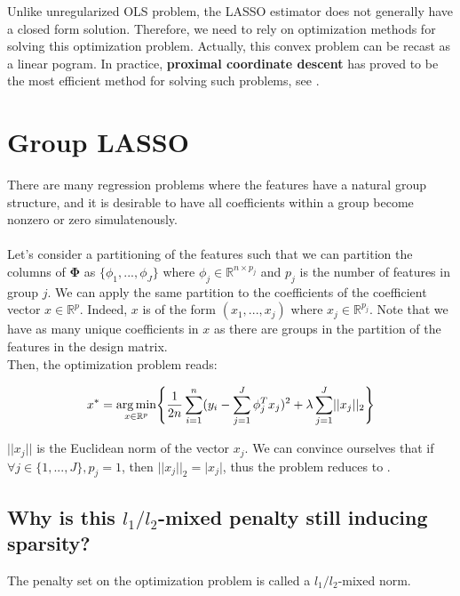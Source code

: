 \documentclass[a4paper,10pt]{article}
\theoremstyle{definition}
\begin{document}
Unlike unregularized OLS problem, the LASSO estimator does not generally have a closed form solution. Therefore, we need to rely on optimization methods for solving this optimization problem. Actually, this convex problem
can be recast as a linear pogram. In practice, \textbf{proximal coordinate descent} has proved to be the most efficient method for solving such problems, see \cite{Bertrand_Massias_Anderson}.

\section{Group LASSO}
\label{section_2}

There are many regression problems where the features have a natural group structure, and it is desirable to have all coefficients within a group become nonzero or zero simulatenously.
\\
\\
Let's consider a partitioning of the features such that we can partition the columns of $\mathbf{\Phi}$ as $\{\phi_{1}, ..., \phi_{J}\}$ where $\phi_{j} \in \mathbb{R}^{n \times p_j}$ and
$p_j$ is the number of features in group $j$. We can apply the same partition to the coefficients of the coefficient vector $x \in \mathbb{R}^p$. Indeed, $x$ is of the form $(x_{1}, ..., x_{j})$ where
$x_{j} \in \mathbb{R}^{p_j}$. Note that we have as many unique coefficients in $x$ as there are groups in the partition of the features in the design matrix.
\\

Then, the optimization problem reads:

\begin{equation*}
    x^* = \operatorname*{arg\,min}_{x \in \mathbb{R}^p} \Biggl\{ \frac{1}{2n} \sum_{i=1}^n (y_i - \sum_{j=1}^J \phi_{j}^T x_{j})^2 + \lambda \sum_{j=1}^{J} \lvert\lvert x_{j} \rvert\rvert_2 \Biggr\}
\end{equation*}

$\lvert\lvert x_{j} \rvert\rvert$ is the Euclidean norm of the vector $x_{j}$. We can convince ourselves that if $\forall j \in \{1, ..., J\}, p_j = 1$, then $\lvert\lvert x_{j} \rvert\rvert_2 = \lvert x_{j} \rvert$,
thus the problem reduces to .

\subsection*{Why is this $l_1 / l_2$-mixed penalty still inducing sparsity?}

The penalty set on the optimization problem is called a $l_1/l_2$-mixed norm.
\\
\end{document}
